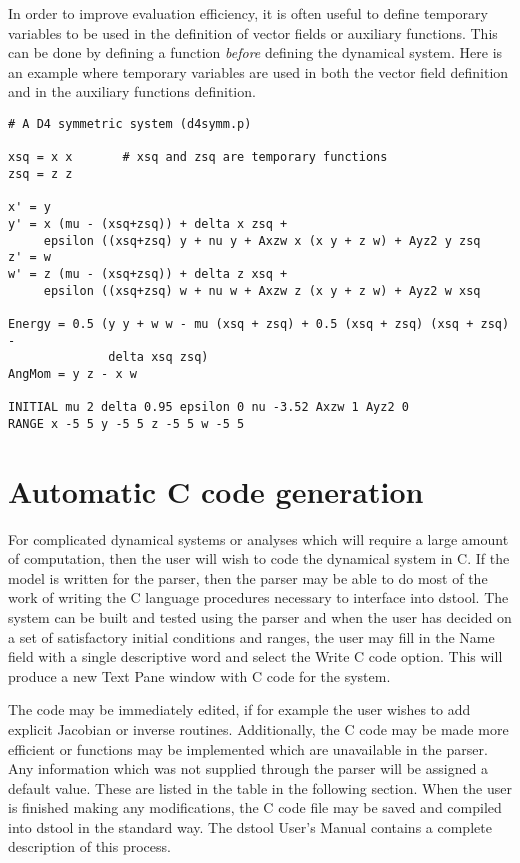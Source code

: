 In order to improve evaluation efficiency, it is often useful
to define temporary variables to be used in the definition of
vector fields or auxiliary functions.  This can be done by
defining a function {\em before} defining the dynamical system.
Here is an example where temporary variables are used
in both the vector field definition and in the auxiliary functions
definition.

\begin{verbatim}
# A D4 symmetric system (d4symm.p)

xsq = x x       # xsq and zsq are temporary functions
zsq = z z

x' = y        
y' = x (mu - (xsq+zsq)) + delta x zsq + 
     epsilon ((xsq+zsq) y + nu y + Axzw x (x y + z w) + Ayz2 y zsq
z' = w
w' = z (mu - (xsq+zsq)) + delta z xsq + 
     epsilon ((xsq+zsq) w + nu w + Axzw z (x y + z w) + Ayz2 w xsq

Energy = 0.5 (y y + w w - mu (xsq + zsq) + 0.5 (xsq + zsq) (xsq + zsq) - 
              delta xsq zsq)
AngMom = y z - x w

INITIAL mu 2 delta 0.95 epsilon 0 nu -3.52 Axzw 1 Ayz2 0
RANGE x -5 5 y -5 5 z -5 5 w -5 5
\end{verbatim}


\section{Automatic C code generation}

For complicated dynamical systems or analyses which will require 
a large amount of computation, then the user will wish to code
the dynamical system in C.  If the model is written for
the parser, then the parser may be able to do most of the
work of writing the C language procedures necessary to 
interface into dstool.  The system can be built and tested using
the parser and when the user has decided on a set of satisfactory initial
conditions and ranges, the user may fill in the Name field with a single
descriptive word and select the Write C code option.
This will produce a new Text Pane window with C code for
the system.  

The code may be immediately edited, if for example the user
wishes to add explicit Jacobian or inverse routines.  Additionally,
the C code may be made more efficient or functions may be
implemented which are unavailable in the parser.
Any information which was not supplied through the parser
will be assigned a default value.  These are listed in
the table in the following section.  When the user is finished
making any modifications, 
the C code file may be saved and compiled into dstool in the
standard way.  The dstool User's Manual contains a complete description
of this process.



